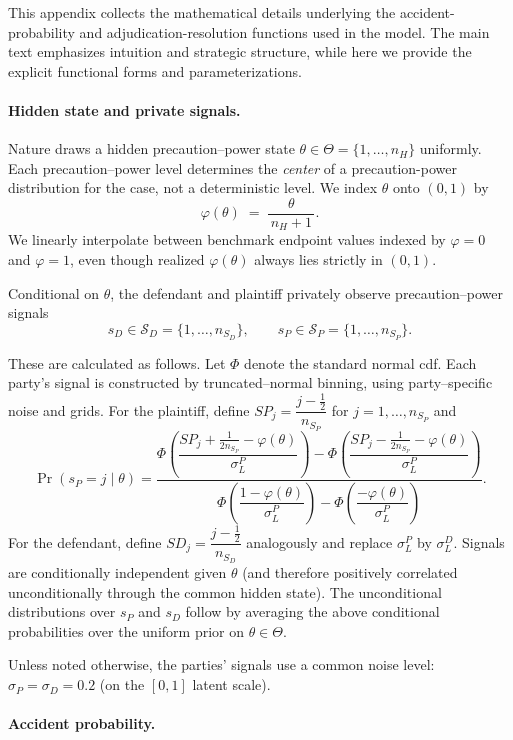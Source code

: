 \documentclass{article}
\begin{document}
This appendix collects the mathematical details underlying the accident-probability and adjudication-resolution functions used in the model. The main text emphasizes intuition and strategic structure, while here we provide the explicit functional forms and parameterizations.

\paragraph{Hidden state and private signals.}
Nature draws a hidden precaution–power state $\theta\in\Theta=\{1,\dots,n_H\}$ uniformly. Each precaution–power level determines the \emph{center} of a precaution-power distribution for the case, not a deterministic level. We index $\theta$ onto $(0,1)$ by
\[
\varphi(\theta)\;=\;\frac{\theta}{\,n_H+1\,}.
\]
We linearly interpolate between benchmark endpoint values indexed by $\varphi=0$ and $\varphi=1$, even though realized $\varphi(\theta)$ always lies strictly in $(0,1)$.

Conditional on $\theta$, the defendant and plaintiff privately observe precaution–power signals
\[
s_D\in\mathcal{S}_D=\{1,\dots,n_{S_D}\},\qquad
s_P\in\mathcal{S}_P=\{1,\dots,n_{S_P}\}.
\]

These are calculated as follows. Let $\Phi$ denote the standard normal cdf. Each party’s signal is constructed by truncated–normal binning, using party–specific noise and grids. For the plaintiff, define $SP_j=\dfrac{j-\tfrac12}{n_{S_P}}$ for $j=1,\dots,n_{S_P}$ and
\[
\Pr(s_P=j\mid \theta)
=
\frac{
\Phi\!\left(\dfrac{SP_j+\tfrac{1}{2n_{S_P}}-\varphi(\theta)}{\sigma_L^{P}}\right)
-
\Phi\!\left(\dfrac{SP_j-\tfrac{1}{2n_{S_P}}-\varphi(\theta)}{\sigma_L^{P}}\right)
}{
\Phi\!\left(\dfrac{1-\varphi(\theta)}{\sigma_L^{P}}\right)
-
\Phi\!\left(\dfrac{-\varphi(\theta)}{\sigma_L^{P}}\right)
}.
\]
For the defendant, define $SD_j=\dfrac{j-\tfrac12}{n_{S_D}}$ analogously and replace $\sigma_L^{P}$ by $\sigma_L^{D}$. Signals are conditionally independent given $\theta$ (and therefore positively correlated unconditionally through the common hidden state). The unconditional distributions over $s_P$ and $s_D$ follow by averaging the above conditional probabilities over the uniform prior on $\theta\in\Theta$. 

Unless noted otherwise, the parties' signals use a common noise level:
$\sigma_P = \sigma_D = 0.2$ (on the $[0,1]$ latent scale). 

\paragraph{Accident probability.}
\end{document}
